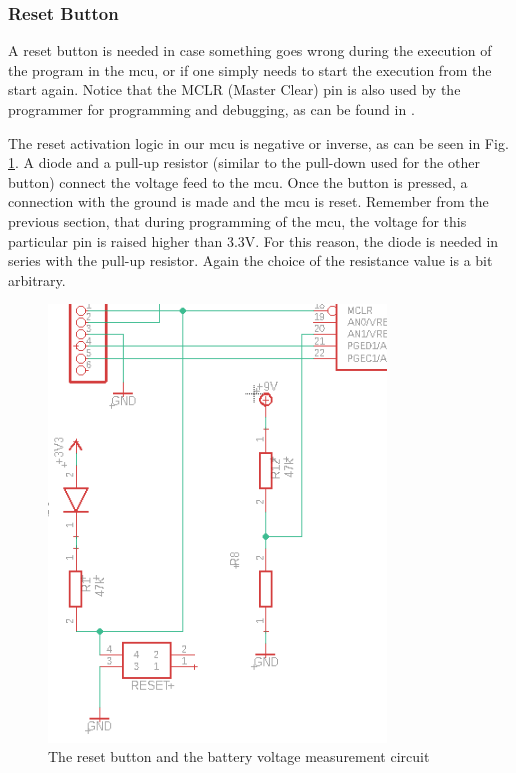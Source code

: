 \FloatBarrier
\vspace{1cm}


\subsubsection{Reset Button}

A reset button is needed in case something goes wrong during the execution of the program in the mcu, or if one simply needs to start the execution from the start again. Notice that the MCLR (Master Clear) pin is also used by the programmer for programming and debugging, as can be found in \cite{mcu}.

\noindent
The reset activation logic in our mcu is negative or inverse, as can be seen in Fig. \ref{fig:reset}. A diode and a pull-up resistor (similar to the pull-down used for the other button) connect the voltage feed to the mcu. Once the button is pressed, a connection with the ground is made and the mcu is reset. Remember from the previous section, that during programming of the mcu, the voltage for this particular pin is raised higher than 3.3V. For this reason, the diode is needed in series with the pull-up resistor.
Again the choice of the resistance value is a bit arbitrary.

\begin{figure}[H]
    \centering
    \includegraphics[width=0.8\textwidth]{figures/hardware/MCLRandBatteryMeasurement.PNG}
    \caption{The reset button and the battery voltage measurement circuit}
    \label{fig:reset}
\end{figure}

